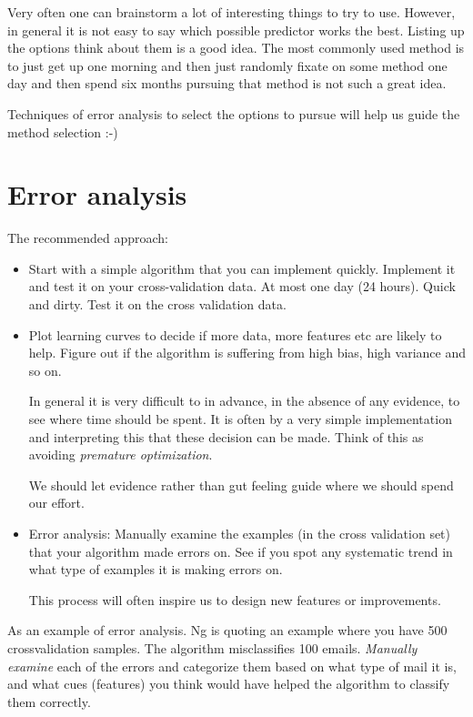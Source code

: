 \documentclass[a4, 12pt, english, USenglish]{scrreprt}
\newcommand{\idx}[1]{{\em #1}\index{#1}}
\begin{document}
Very often one can brainstorm a lot of interesting things to try to
use.  However, in general it is not easy to say which possible
predictor works the best.  Listing up the options think about them is
a good idea.  The most commonly used method is to just get up one
morning and then just randomly fixate on some method one day and then
spend six months pursuing that method is not such a great idea.

Techniques of error analysis to select the options to pursue  will
help us guide the method selection :-)

\section{Error analysis}

The recommended approach:

\begin{itemize}

\item Start with a simple algorithm that you can implement quickly.
  Implement it and test it on your cross-validation data.  At most one
  day (24 hours).   Quick and dirty. Test it on the cross validation data.

\item Plot learning curves to decide if more data, more features etc
  are likely to help.    Figure out if the algorithm is suffering from
  high bias, high variance and so on.   

  In general it is very difficult to in advance, in the absence of any
  evidence, to see where time should be spent.  It is often by a very
  simple implementation and interpreting this that these decision can
  be made.  Think of this as avoiding \idx{premature optimization}.

  We should let evidence rather than gut feeling guide where we should
  spend our effort.


\item Error analysis: Manually examine the examples (in the cross
  validation set) that your algorithm made errors on.  See if you spot
  any systematic trend in what type of examples it is making errors
  on.

  This process will often inspire us to design new features or improvements.

\end{itemize}


As an example of error analysis. Ng is quoting an example where you
have 500 crossvalidation samples.  The algorithm misclassifies 100
emails.  \idx{Manually examine} each of the errors and categorize them
based on what type of mail it is, and what cues (features) you think
would have helped the algorithm to classify them correctly.   
\end{document}

